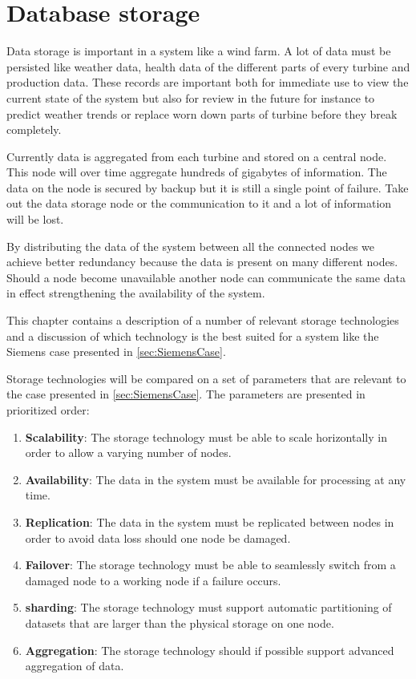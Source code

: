 \section{Database storage}
Data storage is important in a system like a wind farm.
A lot of data must be persisted like weather data, health data of the different parts of every turbine and production data.
These records are important both for immediate use to view the current state of the system but also for review in the future for instance to predict weather trends or replace worn down parts of turbine before they break completely.

Currently data is aggregated from each turbine and stored on a central node.
This node will over time aggregate hundreds of gigabytes of information.
The data on the node is secured by backup but it is still a single point of failure.
Take out the data storage node or the communication to it and a lot of information will be lost.

By distributing the data of the system between all the connected nodes we achieve better redundancy because the data is present on many different nodes.
Should a node become unavailable another node can communicate the same data in effect strengthening the availability of the system.

This chapter contains a description of a number of relevant storage technologies and a discussion of which technology is the best suited for a system like the Siemens case presented in \cref{sec:SiemensCase}.

Storage technologies will be compared on a set of parameters that are relevant to the case presented in \cref{sec:SiemensCase}. The parameters are presented in prioritized order:

\begin{enumerate}
\item \label{enum:parameters:availability} \textbf{Scalability}: The storage technology must be able to scale horizontally in order to allow a varying number of nodes.
\item \textbf{Availability}: The data in the system must be available for processing at any time.
\item \textbf{Replication}: The data in the system must be replicated between nodes in order to avoid data loss should one node be damaged.
\item \textbf{Failover}: The storage technology must be able to seamlessly switch from a damaged node to a working node if a failure occurs.
\item \textbf{sharding}: The storage technology must support automatic partitioning of datasets that are larger than the physical storage on one node.
\item \textbf{Aggregation}: The storage technology should if possible support advanced aggregation of data.
\end{enumerate}

